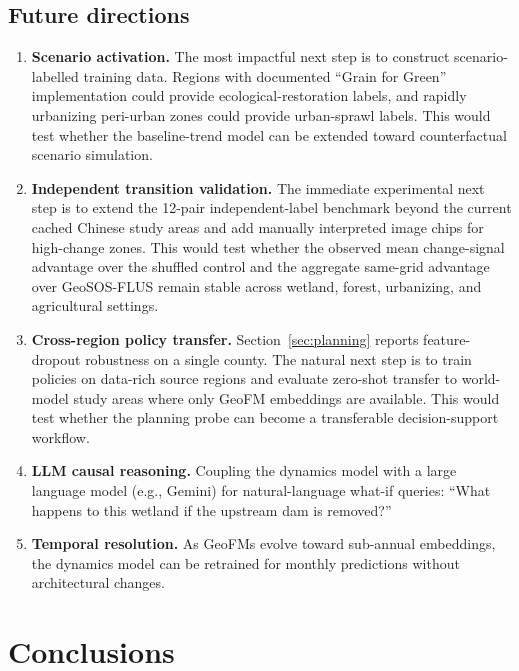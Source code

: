 \documentclass{article}
\begin{document}
\subsection{Future directions}
\label{sec:future}

\begin{enumerate}
\item \textbf{Scenario activation.} The most impactful next step is to construct scenario-labelled training data. Regions with documented ``Grain for Green'' implementation could provide ecological-restoration labels, and rapidly urbanizing peri-urban zones could provide urban-sprawl labels. This would test whether the baseline-trend model can be extended toward counterfactual scenario simulation.

\item \textbf{Independent transition validation.} The immediate experimental next step is to extend the 12-pair independent-label benchmark beyond the current cached Chinese study areas and add manually interpreted image chips for high-change zones. This would test whether the observed mean change-signal advantage over the shuffled control and the aggregate same-grid advantage over GeoSOS-FLUS remain stable across wetland, forest, urbanizing, and agricultural settings.

\item \textbf{Cross-region policy transfer.} Section~\ref{sec:planning} reports feature-dropout robustness on a single county. The natural next step is to train policies on data-rich source regions and evaluate zero-shot transfer to world-model study areas where only GeoFM embeddings are available. This would test whether the planning probe can become a transferable decision-support workflow.

\item \textbf{LLM causal reasoning.} Coupling the dynamics model with a large language model (e.g., Gemini) for natural-language what-if queries: ``What happens to this wetland if the upstream dam is removed?''

\item \textbf{Temporal resolution.} As GeoFMs evolve toward sub-annual embeddings, the dynamics model can be retrained for monthly predictions without architectural changes.
\end{enumerate}

\section{Conclusions}
\label{sec:conclusions}
\end{document}
